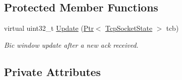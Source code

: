 \subsection*{Protected Member Functions}
\begin{DoxyCompactItemize}
\item 
virtual uint32\+\_\+t \hyperlink{classns3_1_1TcpBic_a900818048f6876e8b38f9d9b8257f631}{Update} (\hyperlink{classns3_1_1Ptr}{Ptr}$<$ \hyperlink{classns3_1_1TcpSocketState}{Tcp\+Socket\+State} $>$ tcb)
\begin{DoxyCompactList}\small\item\em Bic window update after a new ack received. \end{DoxyCompactList}\end{DoxyCompactItemize}
\subsection*{Private Attributes}
